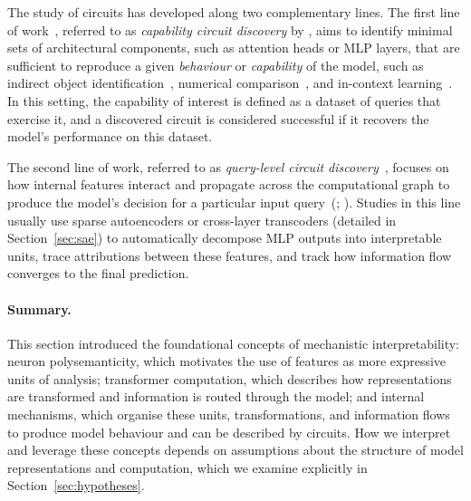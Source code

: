 The study of circuits has developed along two complementary lines. The first line of work~, referred to as \emph{capability circuit discovery} by , aims to identify minimal sets of architectural components, such as attention heads or MLP layers, that are sufficient to reproduce a given \textit{behaviour} or \textit{capability} of the model, such as indirect object identification~, numerical comparison~, and in-context learning~. In this setting, the capability of interest is defined as a dataset of queries that exercise it, and a discovered circuit is considered successful if it recovers the model's performance on this dataset.


The second line of work, referred to as \emph{query-level circuit discovery}~, focuses on how internal features interact and propagate across the computational graph to produce the model's decision for a particular input query~(; ). Studies in this line usually use sparse autoencoders or cross-layer transcoders (detailed in Section~\ref{sec:sae}) to automatically decompose MLP outputs into interpretable units, trace attributions between these features, and track how information flow converges to the final prediction. 

\paragraph{Summary.}
This section introduced the foundational concepts of mechanistic interpretability: neuron polysemanticity, which motivates the use of features as more expressive units of analysis; transformer computation, which describes how representations are transformed and information is routed through the model; and internal mechanisms, which organise these units, transformations, and information flows to produce model behaviour and can be described by circuits. How we interpret and leverage these concepts depends on assumptions about the structure of model representations and computation, which we examine explicitly in Section~\ref{sec:hypotheses}.



